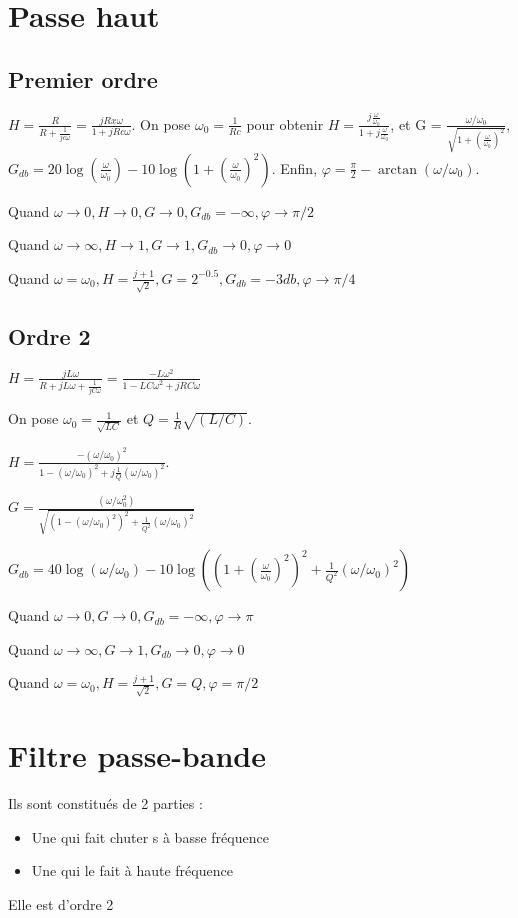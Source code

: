 \documentclass[french]{yLectureNote}
\begin{document}
\section{Passe haut}
\subsection{Premier ordre}
\(H = \frac{R}{R + \frac{1}{jc\omega}} = \frac{jRx\omega}{1+jRc\omega}\). On pose \(\omega_0 = \frac{1}{Rc}\) pour obtenir \(H = \frac{j\frac{\omega}{\omega_0}}{1+j\frac{\omega}{\omega_0}}\), et G = \(\frac{\omega/\omega_0}{\sqrt{1+(\frac{\omega}{\omega_0})^2}}\), \(G_{db} = 20 \log(\frac{\omega}{\omega_0})-10\log(1+(\frac{\omega}{\omega_0})^2)\). Enfin, \(\varphi = \frac{\pi}{2}-\arctan(\omega/\omega_0)\).

Quand \(\omega \to 0, H\to 0, G\to 0, G_{db} = -\infty, \varphi \to \pi/2\)

Quand \(\omega \to \infty, H\to 1, G\to 1, G_{db} \to 0, \varphi \to 0\)

Quand \(\omega = \omega_0, H = \frac{j+1}{\sqrt{2}}, G = 2^{-0.5}, G_{db} =-3db, \varphi \to \pi/4\)
\subsection{Ordre 2}
\(H = \frac{jL\omega}{R + jL\omega+\frac{1}{jC\omega}} = \frac{-L\omega^2}{1-LC\omega^2+jRC\omega}\)

On pose \(\omega_0 = \frac{1}{\sqrt{LC}}\) et \(Q = \frac{1}{R}\sqrt{(L/C)}\).

\(H = \frac{-(\omega/\omega_0)^2}{1-(\omega/\omega_0)^2+j\frac{1}{Q}(\omega/\omega_0)^2}\).

\(G = \frac{(\omega/\omega_0^2)}{\sqrt{(1-(\omega/\omega_0)^2)^2+\frac{1}{Q^2}(\omega/\omega_0)^2}}\)

\(G_{db} = 40 \log(\omega/\omega_0) - 10\log((1+(\frac{\omega}{\omega_0})^2)^2 + \frac{1}{Q^2}(\omega/\omega_0)^2)\)


Quand \(\omega \to 0, G\to 0, G_{db} = -\infty, \varphi \to \pi\)

Quand \(\omega \to \infty, G\to 1, G_{db} \to 0, \varphi \to 0\)

Quand \(\omega = \omega_0, H = \frac{j+1}{\sqrt{2}}, G = Q, \varphi = \pi/2\)
\section{Filtre passe-bande}
Ils sont constitués de 2 parties :
\begin{itemize}
 \item Une qui fait chuter s à basse fréquence
 \item Une qui le fait à haute fréquence
\end{itemize}
Elle est d'ordre 2
\end{document}
